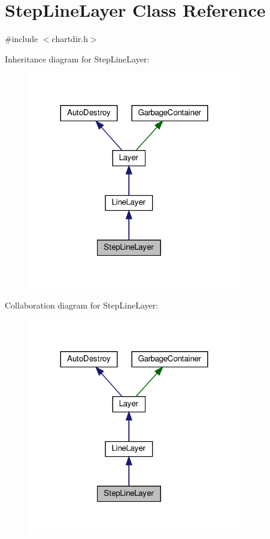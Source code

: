 \hypertarget{class_step_line_layer}{}\section{Step\+Line\+Layer Class Reference}
\label{class_step_line_layer}


{\ttfamily \#include $<$chartdir.\+h$>$}



Inheritance diagram for Step\+Line\+Layer\+:
\nopagebreak
\begin{figure}[H]
\begin{center}
\leavevmode
\includegraphics[width=264pt]{class_step_line_layer__inherit__graph}
\end{center}
\end{figure}


Collaboration diagram for Step\+Line\+Layer\+:
\nopagebreak
\begin{figure}[H]
\begin{center}
\leavevmode
\includegraphics[width=264pt]{class_step_line_layer__coll__graph}
\end{center}
\end{figure}
